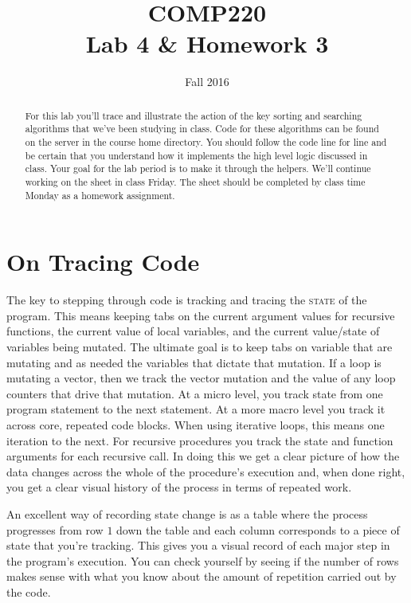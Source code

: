 \documentclass[10pt]{article}
\title{COMP220 \\ Lab 4 \& Homework 3}
\author{ }
\date{Fall 2016}
\begin{document}
\maketitle
\thispagestyle{empty}
\begin{abstract}
For this lab you'll trace and illustrate the action of the key sorting and searching algorithms that we've been studying in class. Code for these algorithms can be found on the server in the course home directory. You should follow the code line for line and be certain that you understand how it implements the high level logic discussed in class. Your goal for the lab period is to make it through the helpers. We'll continue working on the sheet in class Friday. The sheet should be completed by class time Monday as a homework assignment.
\end{abstract}

\section*{On Tracing Code}

The key to stepping through code is tracking and tracing the \textsc{state} of the program. This means keeping tabs on the current argument values for recursive functions, the current value of local variables, and the current value/state of variables being mutated. The ultimate goal is to keep tabs on variable that are mutating and as needed the variables that dictate that mutation. If a loop is mutating a vector, then we track the vector mutation and the value of any loop counters that drive that mutation. At a micro level, you track state from one program statement to the next statement. At a more macro level you track it across core, repeated code blocks.  When using iterative loops, this means one iteration to the next. For recursive procedures you track the state and function arguments for each recursive call. In doing this we get a clear picture of how the data changes across the whole of the procedure's execution and, when done right, you get a clear visual history of the process in terms of repeated work.

An excellent way of recording state change is as a table where the process progresses from row $1$ down the table and each column corresponds to a piece of state that you're tracking. This gives you a visual record of each major step in the program's execution. You can check yourself by seeing if the number of rows makes sense with what you know about the amount of repetition carried out by the code.
\end{document}
